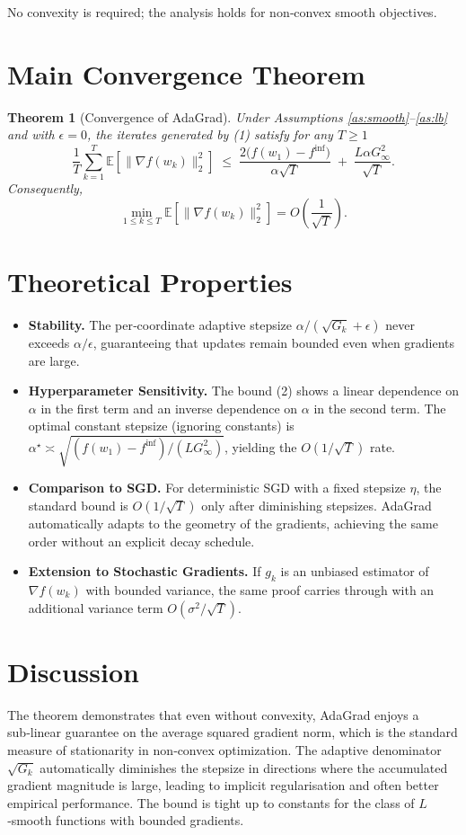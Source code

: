 \documentclass{article}
\newtheorem{theorem}{Theorem}
\begin{document}
No convexity is required; the analysis holds for non‑convex smooth objectives.

\section*{Main Convergence Theorem}
\begin{theorem}[Convergence of AdaGrad]\label{thm:main}
Under Assumptions \ref{as:smooth}–\ref{as:lb} and with $\epsilon=0$, the iterates generated by (1) satisfy for any $T\ge1$
\[
\frac{1}{T}\sum_{k=1}^{T}\mathbb{E}\!\left[\|\nabla f(w_{k})\|_{2}^{2}\right]
\;\le\;
\frac{2\bigl(f(w_{1})-f^{\inf}\bigr)}{\alpha\sqrt{T}}
\;+\;
\frac{L\alpha G_{\infty}^{2}}{\sqrt{T}} .
\tag{2}
\]
Consequently,
\[
\min_{1\le k\le T}\mathbb{E}\!\left[\|\nabla f(w_{k})\|_{2}^{2}\right]
= O\!\left(\frac{1}{\sqrt{T}}\right).
\]
\end{theorem}

\section*{Theoretical Properties}
\begin{itemize}
\item \textbf{Stability.} The per‑coordinate adaptive stepsize $ \alpha/(\sqrt{G_{k}}+\epsilon)$ never exceeds $\alpha/\epsilon$, guaranteeing that updates remain bounded even when gradients are large.
\item \textbf{Hyperparameter Sensitivity.} The bound (2) shows a linear dependence on $\alpha$ in the first term and an inverse dependence on $\alpha$ in the second term. The optimal constant stepsize (ignoring constants) is $\alpha^{\star}\asymp \sqrt{(f(w_{1})-f^{\inf})/(L G_{\infty}^{2})}$, yielding the $O(1/\sqrt{T})$ rate.
\item \textbf{Comparison to SGD.} For deterministic SGD with a fixed stepsize $\eta$, the standard bound is $O(1/\sqrt{T})$ only after diminishing stepsizes. AdaGrad automatically adapts to the geometry of the gradients, achieving the same order without an explicit decay schedule.
\item \textbf{Extension to Stochastic Gradients.} If $g_{k}$ is an unbiased estimator of $\nabla f(w_{k})$ with bounded variance, the same proof carries through with an additional variance term $O(\sigma^{2}/\sqrt{T})$.
\end{itemize}

\section*{Discussion}
The theorem demonstrates that even without convexity, AdaGrad enjoys a sub‑linear guarantee on the average squared gradient norm, which is the standard measure of stationarity in non‑convex optimization. The adaptive denominator $\sqrt{G_{k}}$ automatically diminishes the stepsize in directions where the accumulated gradient magnitude is large, leading to implicit regularisation and often better empirical performance. The bound is tight up to constants for the class of $L$‑smooth functions with bounded gradients.
\end{document}
